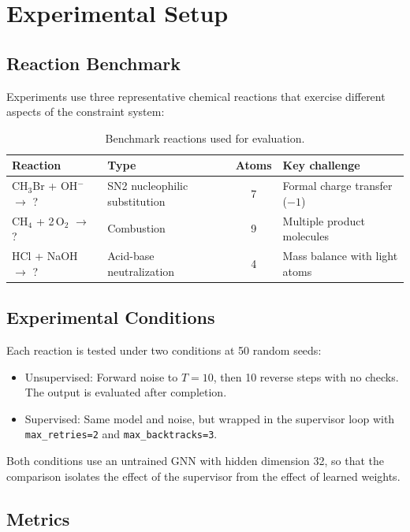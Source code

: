 \documentclass[11pt]{article}
\begin{document}
\section{Experimental Setup}

\subsection{Reaction Benchmark}

Experiments use three representative chemical reactions that exercise
different aspects of the constraint system:

\begin{table}[H]
\centering
\caption{Benchmark reactions used for evaluation.}
\label{tab:reactions}
\begin{tabular}{@{}llcl@{}}
\toprule
Reaction & Type & Atoms & Key challenge \\
\midrule
CH$_3$Br + OH$^-$ $\to$ ? & SN2 nucleophilic substitution & 7 &
  Formal charge transfer ($-1$) \\
CH$_4$ + 2\,O$_2$ $\to$ ? & Combustion & 9 &
  Multiple product molecules \\
HCl + NaOH $\to$ ? & Acid-base neutralization & 4 &
  Mass balance with light atoms \\
\bottomrule
\end{tabular}
\end{table}

\subsection{Experimental Conditions}

Each reaction is tested under two conditions at 50 random seeds:

\begin{itemize}[nosep]
  \item Unsupervised: Forward noise to $T{=}10$, then 10 reverse steps
        with no checks. The output is evaluated after completion.
  \item Supervised: Same model and noise, but wrapped in the supervisor
        loop with \texttt{max\_retries=2} and
        \texttt{max\_backtracks=3}.
\end{itemize}

Both conditions use an untrained GNN with hidden dimension 32, so that
the comparison isolates the effect of the supervisor from the effect of
learned weights.

\subsection{Metrics}
\end{document}
